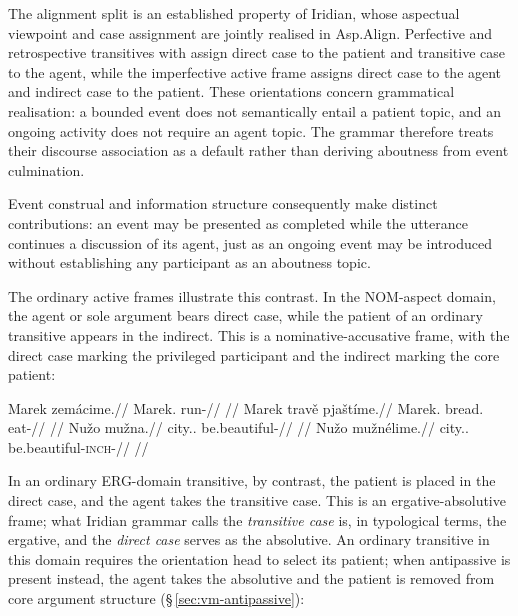 The alignment split is an established property of Iridian, whose aspectual
 viewpoint and case assignment are jointly realised in Asp.Align. Perfective
 and retrospective transitives with  assign direct case to the patient
 and transitive case to the agent, while the imperfective active frame assigns
 direct case to the agent and indirect case to the patient.
 These orientations concern grammatical realisation: a bounded event does not
 semantically entail a patient topic, and an ongoing activity does not require
 an agent topic. The grammar therefore treats their discourse association as
 a default rather than deriving aboutness from event culmination.

Event construal and information structure consequently make distinct
 contributions: an event may be presented as completed while the utterance
 continues a discussion of its agent, just as an ongoing event may be
 introduced without establishing any participant as an aboutness topic.

The ordinary active frames illustrate this contrast.
In the NOM-aspect domain, the agent or sole argument bears direct case,
while the patient of an ordinary transitive appears in
the indirect. This is a nominative-accusative frame, with the direct case
marking the privileged participant and the indirect marking the core patient:

\pex
\a
\begingl
\gla Marek zemácime.//
\glb Marek.\Dir{} run-\Prog{}//
\glft {} //
\endgl
\a
\begingl
\gla Marek travě pjaštíme.//
\glb Marek.\Dir{} bread.\Ind{} eat-\Prog{}//
\glft {} //
\endgl
\a
\begingl
\gla Nužo mužna.//
\glb city.\Dir{}.\Def{} be.beautiful-\Cont{}//
\glft {} //
\endgl
\a
\begingl
\gla Nužo mužnélime.//
\glb city.\Dir{}.\Def{} be.beautiful-\textsc{inch}-\Prog{}//
\glft {} //
\endgl
\xe

In an ordinary ERG-domain transitive, by contrast, the patient is
placed in the direct case, and the agent takes the transitive case. This is an
ergative-absolutive frame; what Iridian grammar calls the \emph{transitive case}
is, in typological terms, the ergative, and the \emph{direct case} serves as
the absolutive. An ordinary transitive in this domain requires the orientation head
 to select its patient; when antipassive
 is present instead, the agent takes the absolutive and the patient is
removed from core argument structure (§\,\ref{sec:vm-antipassive}):

